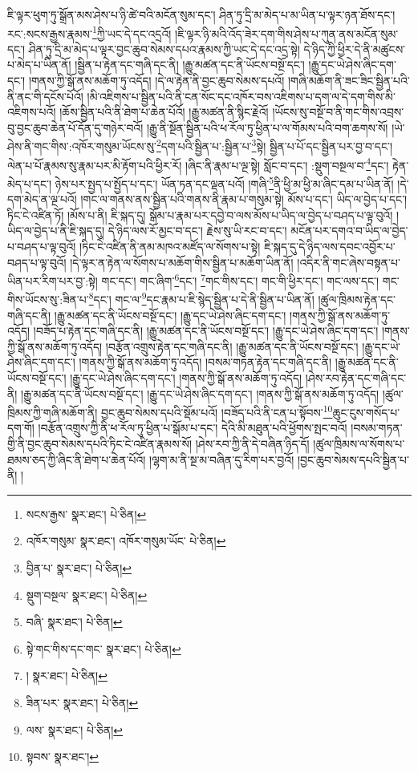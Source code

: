 ཇི་ལྟར་ཕུག་ཏུ་སྒྲོན་མས་ཤེས་པ་ཉི་ཚེ་བའི་མངོན་སུམ་དང་། ཤིན་ཏུ་དྲི་མ་མེད་པ་མ་ཡིན་པ་ལྟར་ཉན་ཐོས་དང་། རང་:སངས་རྒྱས་རྣམས་\footnote{སངས་རྒྱས་  སྣར་ཐང་།  པེ་ཅིན། }ཀྱི་ཡང་དེ་དང་འདྲའོ། །ཇི་ལྟར་ཉི་མའི་འོད་ཟེར་དག་གིས་ཤེས་པ་ཀུན་ནས་མངོན་སུམ་དང་། ཤིན་ཏུ་དྲི་མ་མེད་པ་ལྟར་བྱང་ཆུབ་སེམས་དཔའ་རྣམས་ཀྱི་ཡང་དེ་དང་འདྲ་སྟེ། དེ་ཉིད་ཀྱི་ཕྱིར་དེ་ནི་མཚུངས་པ་མེད་པ་ཡིན་ནོ། །སྦྱིན་པ་རྟེན་དང་གཞི་དང་ནི། །རྒྱུ་མཚན་དང་ནི་ཡོངས་བསྔོ་དང་། །རྒྱུ་དང་ཡེ་ཤེས་ཞིང་དག་དང་། །གནས་ཀྱི་སྒོ་ནས་མཆོག་ཏུ་འདོད། །དེ་ལ་རྟེན་ནི་བྱང་ཆུབ་སེམས་དཔའོ། །གཞི་མཆོག་ནི་ཟང་ཟིང་སྦྱིན་པའི་ནི་ནང་གི་དངོས་པོའོ། །མི་འཇིགས་པ་སྦྱིན་པའི་ནི་ངན་སོང་དང་འཁོར་བས་འཇིགས་པ་དག་ལ་དེ་དག་གིས་མི་འཇིགས་པའོ། །ཆོས་སྦྱིན་པའི་ནི་ཐེག་པ་ཆེན་པོའོ། །རྒྱུ་མཚན་ནི་སྙིང་རྗེའོ། །ཡོངས་སུ་བསྔོ་བ་ནི་གང་གིས་འབྲས་བུ་བྱང་ཆུབ་ཆེན་པོ་དོན་དུ་གཉེར་བའོ། །རྒྱུ་ནི་སྔོན་སྦྱིན་པའི་ཕ་རོལ་ཏུ་ཕྱིན་པ་ལ་གོམས་པའི་བག་ཆགས་སོ། །ཡེ་ཤེས་ནི་གང་གིས་:འཁོར་གསུམ་ཡོངས་སུ་\footnote{འཁོར་གསུམ་  སྣར་ཐང་། འཁོར་གསུམ་ཡོང་  པེ་ཅིན། }དག་པའི་སྦྱིན་པ་:སྦྱིན་པ་\footnote{བྱིན་པ་  སྣར་ཐང་།  པེ་ཅིན། }སྟེ། སྦྱིན་པ་པོ་དང་སྦྱིན་པར་བྱ་བ་དང་། ལེན་པ་པོ་རྣམས་སུ་རྣམ་པར་མི་རྟོག་པའི་ཕྱིར་རོ། །ཞིང་ནི་རྣམ་པ་ལྔ་སྟེ། སློང་བ་དང་། :སྡུག་བསྔལ་བ་\footnote{སྡུག་བསྔལ་  སྣར་ཐང་།  པེ་ཅིན། }དང་། རྟེན་མེད་པ་དང་། ཉེས་པར་སྤྱད་པ་སྤྱོད་པ་དང་། ཡོན་ཏན་དང་ལྡན་པའོ། །གཞི་\footnote{བཞི་  སྣར་ཐང་།  པེ་ཅིན། }ནི་ཕྱི་མ་ཕྱི་མ་ཞིང་དམ་པ་ཡིན་ནོ། །དེ་དག་མེད་ན་ལྔ་པའོ། །གང་ལ་གནས་ནས་སྦྱིན་པའི་གནས་ནི་རྣམ་པ་གསུམ་སྟེ། མོས་པ་དང་། ཡིད་ལ་བྱེད་པ་དང་། ཏིང་ངེ་འཛིན་ཏོ། །མོས་པ་ནི། ཇི་སྐད་དུ། སྒོམ་པ་རྣམ་པར་དབྱེ་བ་ལས་མོས་པ་ཡིད་ལ་བྱེད་པ་བཤད་པ་ལྟ་བུའོ། །ཡིད་ལ་བྱེད་པ་ནི་ཇི་སྐད་དུ། དེ་ཉིད་ལས་རོ་མྱང་བ་དང་། རྗེས་སུ་ཡི་རང་བ་དང་། མངོན་པར་དགའ་བ་ཡིད་ལ་བྱེད་པ་བཤད་པ་ལྟ་བུའོ། །ཏིང་ངེ་འཛིན་ནི་ནམ་མཁའ་མཛོད་ལ་སོགས་པ་སྟེ། ཇི་སྐད་དུ་དེ་ཉིད་ལས་དབང་འབྱོར་པ་བཤད་པ་ལྟ་བུའོ། །དེ་ལྟར་ན་རྟེན་ལ་སོགས་པ་མཆོག་གིས་སྦྱིན་པ་མཆོག་ཡིན་ནོ། །འདིར་ནི་གང་ཞེས་བསྟན་པ་ཡིན་པར་རིག་པར་བྱ་:སྟེ། གང་དང་། གང་ཞིག་\footnote{སྟེ་གང་གིས་དང་གང་  སྣར་ཐང་།  པེ་ཅིན། }དང་། \footnote{།    སྣར་ཐང་།  པེ་ཅིན། }གང་གིས་དང་། གང་གི་ཕྱིར་དང་། གང་ལས་དང་། གང་གིས་ཡོངས་སུ་:ཟིན་པ་\footnote{ཟིན་པར་  སྣར་ཐང་།  པེ་ཅིན། }དང་། གང་ལ་\footnote{ལས་  སྣར་ཐང་།  པེ་ཅིན། }དང་རྣམ་པ་ཇི་སྙེད་སྦྱིན་པ་དེ་ནི་སྦྱིན་པ་ཡིན་ནོ། །ཚུལ་ཁྲིམས་རྟེན་དང་གཞི་དང་ནི། །རྒྱུ་མཚན་དང་ནི་ཡོངས་བསྔོ་དང་། །རྒྱུ་དང་ཡེ་ཤེས་ཞིང་དག་དང་། །གནས་ཀྱི་སྒོ་ནས་མཆོག་ཏུ་འདོད། །བཟོད་པ་རྟེན་དང་གཞི་དང་ནི། །རྒྱུ་མཚན་དང་ནི་ཡོངས་བསྔོ་དང་། །རྒྱུ་དང་ཡེ་ཤེས་ཞིང་དག་དང་། །གནས་ཀྱི་སྒོ་ནས་མཆོག་ཏུ་འདོད། །བརྩོན་འགྲུས་རྟེན་དང་གཞི་དང་ནི། །རྒྱུ་མཚན་དང་ནི་ཡོངས་བསྔོ་དང་། །རྒྱུ་དང་ཡེ་ཤེས་ཞིང་དག་དང་། །གནས་ཀྱི་སྒོ་ནས་མཆོག་ཏུ་འདོད། །བསམ་གཏན་རྟེན་དང་གཞི་དང་ནི། །རྒྱུ་མཚན་དང་ནི་ཡོངས་བསྔོ་དང་། །རྒྱུ་དང་ཡེ་ཤེས་ཞིང་དག་དང་། །གནས་ཀྱི་སྒོ་ནས་མཆོག་ཏུ་འདོད། །ཤེས་རབ་རྟེན་དང་གཞི་དང་ནི། །རྒྱུ་མཚན་དང་ནི་ཡོངས་བསྔོ་དང་། །རྒྱུ་དང་ཡེ་ཤེས་ཞིང་དག་དང་། །གནས་ཀྱི་སྒོ་ནས་མཆོག་ཏུ་འདོད། །ཚུལ་ཁྲིམས་ཀྱི་གཞི་མཆོག་ནི། བྱང་ཆུབ་སེམས་དཔའི་སྡོམ་པའོ། །བཟོད་པའི་ནི་ངན་པ་སྟོབས་\footnote{སྟབས་  སྣར་ཐང་། }ཆུང་ངུས་གསོད་པ་དག་གོ། །བརྩོན་འགྲུས་ཀྱི་ནི་ཕ་རོལ་ཏུ་ཕྱིན་པ་སྒོམ་པ་དང་། དེའི་མི་མཐུན་པའི་ཕྱོགས་སྤང་བའོ། །བསམ་གཏན་གྱི་ནི་བྱང་ཆུབ་སེམས་དཔའི་ཏིང་ངེ་འཛིན་རྣམས་སོ། །ཤེས་རབ་ཀྱི་ནི་དེ་བཞིན་ཉིད་དོ། །ཚུལ་ཁྲིམས་ལ་སོགས་པ་ཐམས་ཅད་ཀྱི་ཞིང་ནི་ཐེག་པ་ཆེན་པོའོ། །ལྷག་མ་ནི་སྔ་མ་བཞིན་དུ་རིག་པར་བྱའོ། །བྱང་ཆུབ་སེམས་དཔའི་སྦྱིན་པ་ནི། །

